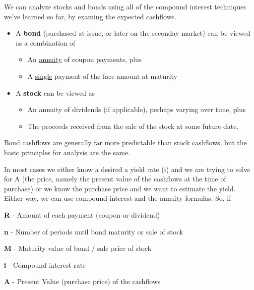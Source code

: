 \documentclass[14pt]{extarticle}
\begin{document}


We can analyze {stocks} and {bonds} using all of the compound interest techniques we've
learned so far, by examing the expected cashflows.

\begin{itemize}
  \item A \textbf{bond} (purchased at issue, or later on the seconday market) can be viewed as a combination of
    \begin{itemize}
      \item An \underline{annuity} of coupon payments, plus
      \item A \underline{single} payment of the face amount at maturity
    \end{itemize}
  \item A \textbf{stock} can be viewed as
    \begin{itemize}
      \item An annuity of dividends (if applicable), perhaps varying over time, plus
      \item The proceeds received from the sale of the stock at some future date.
    \end{itemize}
\end{itemize}
\vspace{.1in}

Bond cashflows are generally far more predictable than stock cashflows, but the basic principles
for analysis are the same.

In most cases we either know a desired a yield rate (i) and we are trying to solve for A (the
price, namely the present value of the cashflows at the time of purchase) or we know the
purchase price and we want to estimate the yield.  Either way, we can use compound interest and
the annuity formulas.  So, if

\begin{description}
  \item \textbf{R} - Amount of each payment (coupon or dividend)
  \item\textbf{n} - Number of periods until bond maturity or sale of stock
  \item\textbf{M} - Maturity value of bond / sale price of stock
  \item\textbf{i} - Compound interest rate
  \item\textbf{A} - Present Value (purchase price) of the cashflows
\end{description}
\vspace{.1in}
\end{document}
